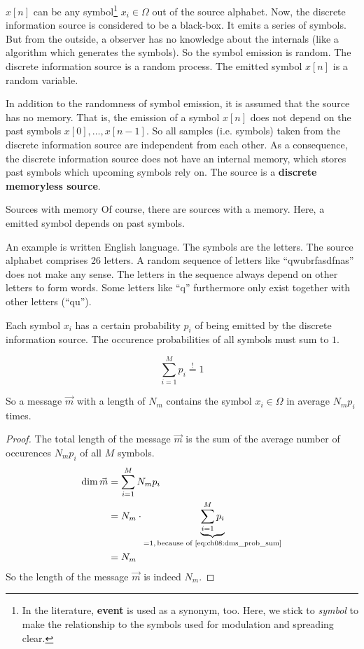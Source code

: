 \begin{refsection}
$x[n]$ can be any symbol\footnote{In the literature, \textbf{event} is used as a synonym, too. Here, we stick to \emph{symbol} to make the relationship to the symbols used for modulation and spreading clear.} $x_i \in \Omega$ out of the source alphabet. Now, the discrete information source is considered to be a black-box. It emits a series of symbols. But from the outside, a observer has no knowledge about the internals (like a algorithm which generates the symbols). So the symbol emission is random. The discrete information source is a random process. The emitted symbol $x[n]$ is a random variable.

In addition to the randomness of symbol emission, it is assumed that the source has no memory. That is, the emission of a symbol $x[n]$ does not depend on the past symbols $x[0], \ldots, x[n-1]$. So all samples (i.e. symbols) taken from the discrete information source are independent from each other. As a consequence, the discrete information source does not have an internal memory, which stores past symbols which upcoming symbols rely on. The source is a  \textbf{discrete memoryless source}.

\begin{excursus}{Sources with memory}
	Of course, there are sources with a memory. Here, a emitted symbol depends on past symbols.
	
	An example is written English language. The symbols are the letters. The source alphabet comprises 26 letters. A random sequence of letters like ``qwubrfasdfnas'' does not make any sense. The letters in the sequence always depend on other letters to form words. Some letters like ``q'' furthermore only exist together with other letters (``qu'').
\end{excursus}

Each symbol $x_i$ has a certain probability $p_i$ of being emitted by the discrete information source. The occurence probabilities of all symbols must sum to $1$.

\begin{equation}
	\sum\limits_{i=1}^{M} p_i \stackrel{!}{=} 1
	\label{eq:ch08:dms_prob_sum}
\end{equation}

So a message $\vec{m}$ with a length of $N_m$ contains the symbol $x_i \in \Omega$ in average $N_m p_i$ times.

\begin{proof}{}
	The total length of the message $\vec{m}$ is the sum of the average number of occurences $N_m p_i$ of all $M$ symbols.
	\begin{equation}
		\begin{split}
			\dim \vec{m} &= \sum\limits_{i=1}^{M} N_m p_i \\
			 &= N_m \cdot \underbrace{\sum\limits_{i=1}^{M} p_i}_{= 1, \, \text{because of \eqref{eq:ch08:dms_prob_sum}}} \\
			 &= N_m
		\end{split}
	\end{equation}
	So the length of the message $\vec{m}$ is indeed $N_m$.
\end{proof}


\end{refsection}
